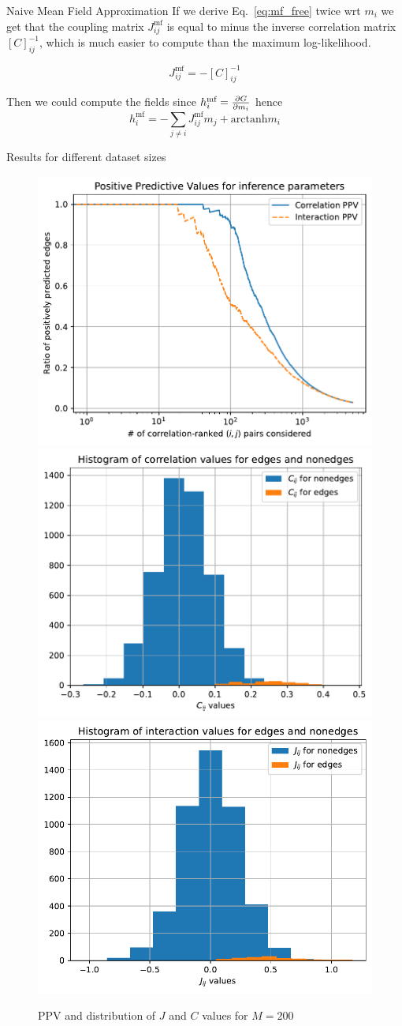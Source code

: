 \documentclass[handout]{beamer}
\newcommand{\arctanh}{\text{arctanh}}
\begin{document}
\begin{frame}{Naive Mean Field Approximation}
    If we derive Eq.~\ref{eq:mf_free} twice wrt $m_i$ we get that the coupling
    matrix $J^{\text{mf}}_{ij}$ is equal to minus the inverse correlation matrix
    $[C]_{ij}^{-1}$, which is much easier to compute than the maximum
    log-likelihood.

    \begin{equation}
        J^{\text{mf}}_{ij} = - [C]_{ij}^{-1}
    \end{equation}

    Then we could compute the fields since $h_i^{\text{mf}}=\pdv{G}{m_i}$ hence
    \begin{equation}
    h_i^{\text{mf}} = -\sum_{j\neq i} J_{ij}^{\text{mf}} m_j + \arctanh{m_i}
    \end{equation}
    \cite[17]{inverse}
\end{frame}

\begin{frame}{Results for different dataset sizes}
    \begin{figure}
        \includegraphics[width=.3\textwidth]{ppv_2h}
        \includegraphics[width=.3\textwidth]{nmf_chist_2h}
        \includegraphics[width=.3\textwidth]{nmf_jhist_2h}
        \caption{PPV and distribution of $J$ and $C$ values for $M=200$}
        \label{fig:nmf_2h}
    \end{figure}
\end{frame}
\end{document}

